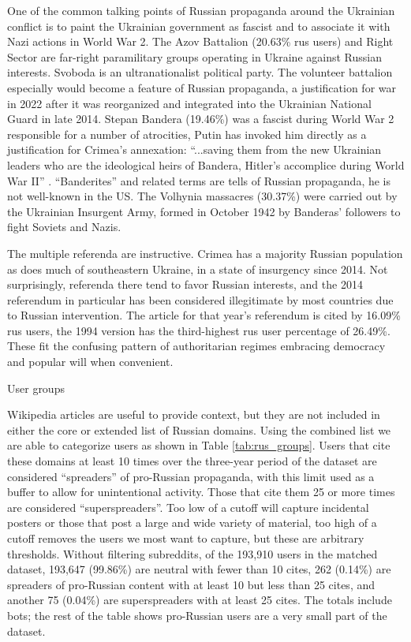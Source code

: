 One of the common talking points of Russian propaganda around the Ukrainian conflict is to paint the Ukrainian government as fascist and to associate it with Nazi actions in World War 2.
The Azov Battalion (20.63\% rus users) and Right Sector are far-right paramilitary groups operating in Ukraine against Russian interests.
Svoboda is an ultranationalist political party.
The volunteer battalion especially would become a feature of Russian propaganda, a justification for war in 2022 after it was reorganized and integrated into the Ukrainian National Guard in late 2014.
Stepan Bandera (19.46\%) was a fascist during World War 2 responsible for a number of atrocities, Putin has invoked him directly as a justification for Crimea's annexation: ``...saving them from the new Ukrainian leaders who are the ideological heirs of Bandera, Hitler's accomplice during World War II'' \cite[p. 204]{garcia2016}.
``Banderites'' and related terms are tells of Russian propaganda, he is not well-known in the US.
The Volhynia massacres (30.37\%) were carried out by the Ukrainian Insurgent Army, formed in October 1942 by Banderas' followers to fight Soviets and Nazis.

The multiple referenda are instructive.
Crimea has a majority Russian population as does much of southeastern Ukraine, in a state of insurgency since 2014.
Not surprisingly, referenda there tend to favor Russian interests, and the 2014 referendum in particular has been considered illegitimate by most countries due to Russian intervention.
The article for that year's referendum is cited by 16.09\% rus users, the 1994 version has the third-highest rus user percentage of 26.49\%.
These fit the confusing pattern of authoritarian regimes embracing democracy and popular will when convenient.

\begin{table}[!ht]
\centering
\caption{User groups}

\label{tab:rus_groups}
\end{table}

Wikipedia articles are useful to provide context, but they are not included in either the core or extended list of Russian domains.
Using the combined list we are able to categorize users as shown in Table \ref{tab:rus_groups}.
Users that cite these domains at least 10 times over the three-year period of the dataset are considered ``spreaders'' of pro-Russian propaganda, with this limit used as a buffer to allow for unintentional activity.
Those that cite them 25 or more times are considered ``superspreaders''.
Too low of a cutoff will capture incidental posters or those that post a large and wide variety of material, too high of a cutoff removes the users we most want to capture, but these are arbitrary thresholds.
Without filtering subreddits, of the 193,910 users in the matched dataset, 193,647 (99.86\%) are neutral with fewer than 10 cites, 262 (0.14\%) are spreaders of pro-Russian content with at least 10 but less than 25 cites, and another 75 (0.04\%) are superspreaders with at least 25 cites. 
The totals include bots; the rest of the table shows pro-Russian users are a very small part of the dataset.

